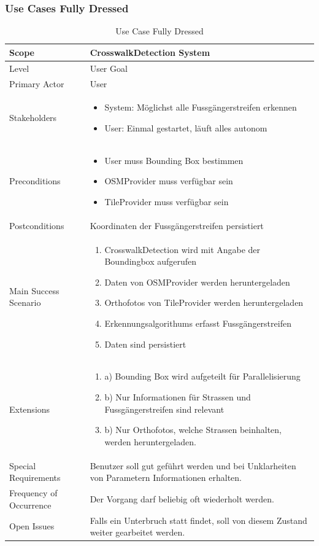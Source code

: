 \subsubsection{Use Cases Fully Dressed}
\begin{table}[H]
    \begin{tabular}{ | p{4cm} | p{10cm}  | }
    \hline
    Scope & CrosswalkDetection System   \\ \hline
	Level  & User Goal \\ \hline
	Primary Actor & User \\ \hline 
	Stakeholders & 
	\begin{itemize}
		\item System: Möglichst alle Fussgängerstreifen erkennen
		\item User: Einmal gestartet, läuft alles autonom
    \end{itemize} \\ \hline
	Preconditions & 
		\begin{itemize}
		\item User muss Bounding Box bestimmen
		\item OSMProvider muss verfügbar sein
		\item TileProvider muss verfügbar sein
    \end{itemize} \\ \hline
	Postconditions & Koordinaten der Fussgängerstreifen persistiert \\ \hline
	Main Success Scenario & 
	\begin{enumerate}
		\item CrosswalkDetection wird mit Angabe der Boundingbox aufgerufen
		\item Daten von OSMProvider werden heruntergeladen
		\item Orthofotos von TileProvider werden heruntergeladen
		\item Erkennungsalgorithums erfasst Fussgängerstreifen
		\item Daten sind persistiert
	\end{enumerate} \\ \hline
	Extensions & 
	\begin{enumerate}
		\item a) Bounding Box wird aufgeteilt für Parallelisierung
		\item b) Nur Informationen für Strassen und Fussgängerstreifen sind relevant
		\item b) Nur Orthofotos, welche Strassen beinhalten, werden heruntergeladen.
	\end{enumerate} \\ \hline
	Special Requirements & Benutzer soll gut geführt werden und bei Unklarheiten
von Parametern Informationen erhalten. \\ \hline
	Frequency of Occurrence & Der Vorgang darf beliebig oft wiederholt werden. \\ \hline
	Open Issues & Falls ein Unterbruch statt findet, soll von diesem Zustand weiter gearbeitet werden. \\ \hline
    \end{tabular}
    \caption[Use Case Fully Dressed]{Use Case Fully Dressed}
\end{table}


